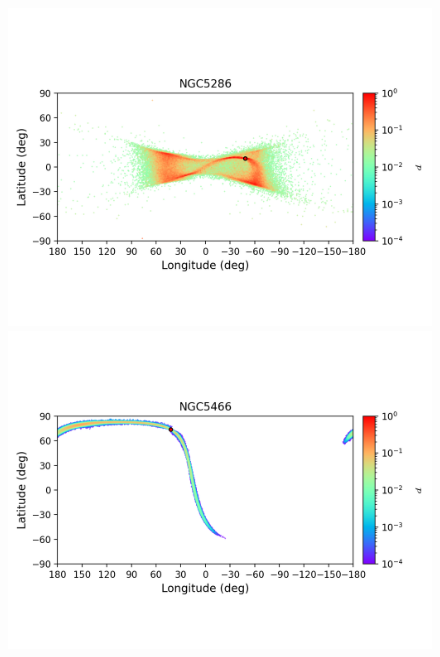 \begin{figure}
\begin{center}
                \includegraphics[clip=true, trim = 0mm 20mm 0mm 10mm, width=1\columnwidth]{images/error_plots_NGC5286.png}
                \includegraphics[clip=true, trim = 0mm 20mm 0mm 10mm, width=1\columnwidth]{images/error_plots_NGC5466.png}
                

\end{center}
\end{figure}

